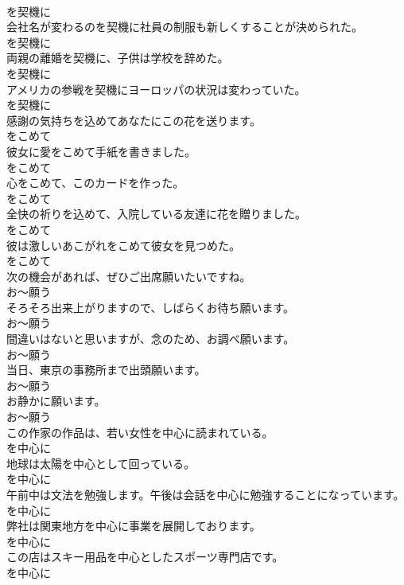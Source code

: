 \documentclass[8pt]{extreport}
\begin{document}
\begin{CJK}{UTF8}{min}
\\	を契機に
\\	会社名が変わるのを契機に社員の制服も新しくすることが決められた。	
\\	を契機に
\\	両親の離婚を契機に、子供は学校を辞めた。	
\\	を契機に
\\	アメリカの参戦を契機にヨーロッパの状況は変わっていた。	
\\	を契機に
\\	感謝の気持ちを込めてあなたにこの花を送ります。	
\\	をこめて
\\	彼女に愛をこめて手紙を書きました。	
\\	をこめて
\\	心をこめて、このカードを作った。	
\\	をこめて
\\	全快の祈りを込めて、入院している友達に花を贈りました。	
\\	をこめて
\\	彼は激しいあこがれをこめて彼女を見つめた。	
\\	をこめて
\\	次の機会があれば、ぜひご出席願いたいですね。	
\\	お～願う
\\	そろそろ出来上がりますので、しばらくお待ち願います。	
\\	お～願う
\\	間違いはないと思いますが、念のため、お調べ願います。	
\\	お～願う
\\	当日、東京の事務所まで出頭願います。	
\\	お～願う
\\	お静かに願います。	
\\	お～願う
\\	この作家の作品は、若い女性を中心に読まれている。	
\\	を中心に
\\	地球は太陽を中心として回っている。	
\\	を中心に
\\	午前中は文法を勉強します。午後は会話を中心に勉強することになっています。	
\\	を中心に
\\	弊社は関東地方を中心に事業を展開しております。	
\\	を中心に
\\	この店はスキー用品を中心としたスポーツ専門店です。	
\\	を中心に

\end{CJK}
\end{document}
